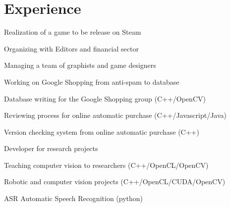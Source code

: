 \documentclass[a4paper]{deedy-resume} %
\begin{document}
\hfill
%
%
\begin{minipage}[t]{0.66\textwidth} %


\section{Experience}


Realization of a game to be release on Steam
\vspace{\topsep} %
\begin{tightitemize}
\item Organizing with Editors and financial sector
\item Managing a team of graphists and game designers
\end{tightitemize}

\sectionspace %



Working on Google Shopping from anti-spam to database
\begin{tightitemize}
\item Database writing for the Google Shopping group (C++/OpenCV)
\item Reviewing process for online automatic purchase (C++/Javascript/Java)
\item Version checking system from online automatic purchase (C++)
\end{tightitemize}

\sectionspace %



Developer for research projects
\begin{tightitemize}
\item Teaching computer vision to researchers (C++/OpenCL/OpenCV)
\item Robotic and computer vision projects (C++/OpenCL/CUDA/OpenCV)
\item ASR Automatic Speech Recognition (python)
\end{tightitemize}


\end{minipage}
\end{document}
